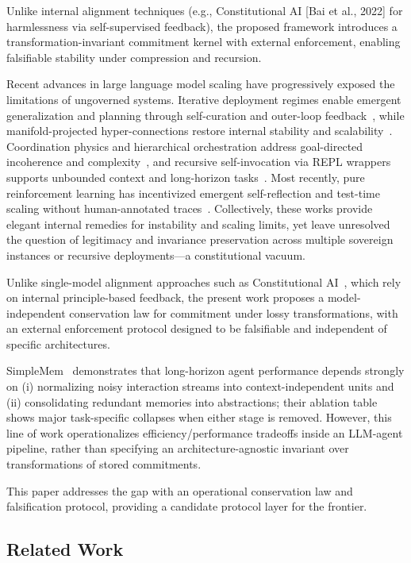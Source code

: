 \documentclass[11pt,a4paper]{article}
\begin{document}
Unlike internal alignment techniques (e.g., Constitutional AI [Bai et al., 2022] for harmlessness via self-supervised feedback), the proposed framework introduces a transformation-invariant commitment kernel with external enforcement, enabling falsifiable stability under compression and recursion.

Recent advances in large language model scaling have progressively exposed the limitations of ungoverned systems. Iterative deployment regimes enable emergent generalization and planning through self-curation and outer-loop feedback~\cite{correa2025}, while manifold-projected hyper-connections restore internal stability and scalability~\cite{xie2025}. Coordination physics and hierarchical orchestration address goal-directed incoherence and complexity~\cite{chang2025}, and recursive self-invocation via REPL wrappers supports unbounded context and long-horizon tasks~\cite{zhang2025}. Most recently, pure reinforcement learning has incentivized emergent self-reflection and test-time scaling without human-annotated traces~\cite{guo2025}. Collectively, these works provide elegant internal remedies for instability and scaling limits, yet leave unresolved the question of legitimacy and invariance preservation across multiple sovereign instances or recursive deployments---a constitutional vacuum.

Unlike single-model alignment approaches such as Constitutional AI~\cite{bai2022}, which rely on internal principle-based feedback, the present work proposes a model-independent conservation law for commitment under lossy transformations, with an external enforcement protocol designed to be falsifiable and independent of specific architectures.

SimpleMem~\cite{chen2026} demonstrates that long-horizon agent performance depends strongly on (i) normalizing noisy interaction streams into context-independent units and (ii) consolidating redundant memories into abstractions; their ablation table shows major task-specific collapses when either stage is removed. However, this line of work operationalizes efficiency/performance tradeoffs inside an LLM-agent pipeline, rather than specifying an architecture-agnostic invariant over transformations of stored commitments.

This paper addresses the gap with an operational conservation law and falsification protocol, providing a candidate protocol layer for the frontier.

\subsection{Related Work}
\label{sec:related-work}
\end{document}
